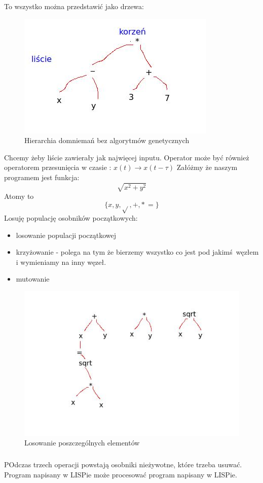 \documentclass{article}
\begin{document}
		To wszystko można przedstawić jako drzewa: \\
				\begin{figure}[ht]
					\label{fig:fig2}
					\centering
					\includegraphics[scale=0.5]{drzewowosc.jpg}
					\caption{Hierarchia domniemań bez algorytmów genetycznych}
				\end{figure}
		Chcemy żeby liście zawierały jak najwięcej inputu. Operator może być również operatorem przesunięcia w czasie : $x(t) \rightarrow x(t - \tau)$
		Załóżmy że naszym programem jest funkcja: 
		$$\sqrt{x^2+y^2}$$
		Atomy to $$\{ x,y,\sqrt{},+ ,* \, =\}$$
		Losuję populację osobników początkowych:
		\begin{itemize}
			\item losowanie populacji początkowej 
			\item krzyżowanie - polega na tym że bierzemy wszystko co jest pod jakimś węzłem i wymieniamy na inny węzeł.
			\item mutowanie
		\end{itemize}
						\begin{figure}[ht]
							\label{fig:fig2}
							\centering
							\includegraphics[scale=0.5]{prog_gen_losowanie.jpeg}
							\caption{Losowanie poszczególnych elementów}
						\end{figure}
		\subparagraph{}POdczas trzech operacji powstają osobniki nieżywotne, które trzeba usuwać. 
		Program napisany w LISPie może procesować program napisany w LISPie. 
\end{document}
